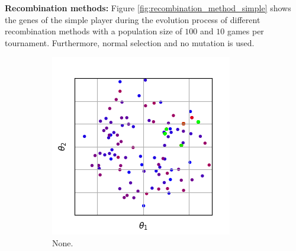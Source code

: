 \documentclass{llncs}
\begin{document}
\textbf{Recombination methods:} Figure \ref{fig:recombination_method_simple} shows the genes of the simple player during the evolution process of different recombination methods with a population size of $100$ and $10$ games per tournament. Furthermore, normal selection and no mutation is used.
\begin{figure}[t]
    \centering
    \begin{subfigure}[t]{0.24\textwidth}
        \centering
        \captionsetup{width=.9\textwidth}
        \includegraphics[width=\textwidth]{figures/recombination/simple_normal-100-10_0-1.png}
        \caption{None.}
        \label{subfig:recomb_none_01}
    \end{subfigure}
    \begin{subfigure}[t]{0.24\textwidth}
        \centering
        \captionsetup{width=.9\textwidth}

\end{subfigure}
\end{figure}
\end{document}
